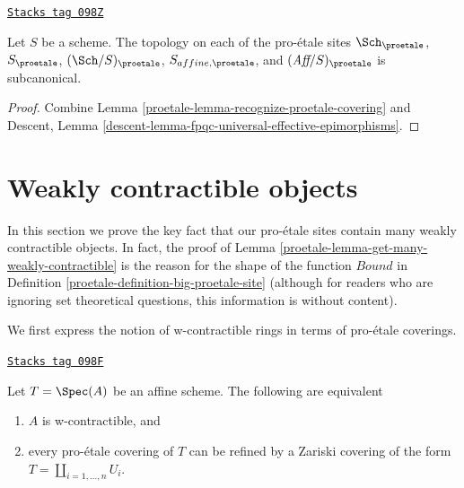 \begin{lemma}
\label{proetale-lemma-proetale-subcanonical}
\href{https://stacks.math.columbia.edu/tag/098Z}{\texttt{Stacks tag 098Z}}

Let $S$ be a scheme. The topology on each of the pro-\'etale sites
$\Sch_\proetale$, $S_\proetale$, $(\Sch/S)_\proetale$,
$S_{affine, \proetale}$, and $(\textit{Aff}/S)_\proetale$ is subcanonical.
\end{lemma}

\begin{proof}

Combine Lemma \ref{proetale-lemma-recognize-proetale-covering} and
Descent, Lemma \ref{descent-lemma-fpqc-universal-effective-epimorphisms}.
\end{proof}

\section{Weakly contractible objects}
\label{proetale-section-weakly-contractible}
In this section we prove the key fact that our pro-\'etale sites
contain many weakly contractible objects. In fact, the proof of
Lemma \ref{proetale-lemma-get-many-weakly-contractible} is the reason for
the shape of the function $Bound$ in
Definition \ref{proetale-definition-big-proetale-site} (although
for readers who are ignoring set theoretical questions, this
information is without content).

We first express the notion of w-contractible rings in terms of
pro-\'etale coverings.

\begin{lemma}
\label{proetale-lemma-w-contractible-proetale-cover}
\href{https://stacks.math.columbia.edu/tag/098F}{\texttt{Stacks tag 098F}}

Let $T = \Spec(A)$ be an affine scheme. The following are equivalent
\begin{enumerate}
\item $A$ is w-contractible, and
\item every pro-\'etale covering of $T$ can be refined by
a Zariski covering of the form $T = \coprod_{i = 1, \ldots, n} U_i$.
\end{enumerate}
\end{lemma}

